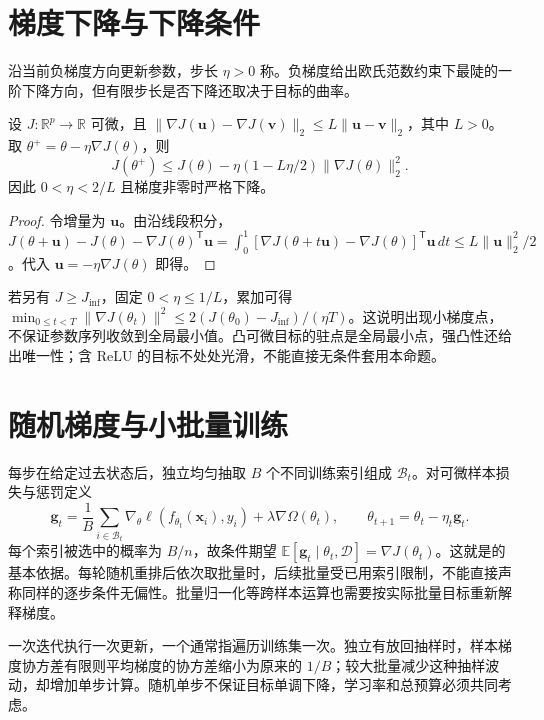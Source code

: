 \documentclass[UTF8,12pt,a4paper,fontset=fandol]{ctexbook}
\begin{document}
\section{梯度下降与下降条件}
沿当前负梯度方向更新参数，步长 $\eta>0$ 称。负梯度给出欧氏范数约束下最陡的一阶下降方向，但有限步长是否下降还取决于目标的曲率。
\begin{proposition}[光滑函数的单步下降]
设 $J:\mathbb R^p\to\mathbb R$ 可微，且 $\|\nabla J(\mathbf u)-\nabla J(\mathbf v)\|_2\leq L\|\mathbf u-\mathbf v\|_2$，其中 $L>0$。取 $\theta^+=\theta-\eta\nabla J(\theta)$，则
\begin{equation}
J(\theta^+)\leq J(\theta)-\eta(1-L\eta/2)\|\nabla J(\theta)\|_2^2.
\label{eq:dl-descent}
\end{equation}
因此 $0<\eta<2/L$ 且梯度非零时严格下降。
\end{proposition}
\begin{proof}
令增量为 $\mathbf u$。由沿线段积分，$J(\theta+\mathbf u)-J(\theta)-\nabla J(\theta)^\mathsf T\mathbf u=\int_0^1[\nabla J(\theta+t\mathbf u)-\nabla J(\theta)]^\mathsf T\mathbf u\,dt\leq L\|\mathbf u\|_2^2/2$。代入 $\mathbf u=-\eta\nabla J(\theta)$ 即得。
\end{proof}
若另有 $J\geq J_{\inf}$，固定 $0<\eta\leq1/L$，累加可得 $\min_{0\leq t<T}\|\nabla J(\theta_t)\|^2\leq2(J(\theta_0)-J_{\inf})/(\eta T)$。这说明出现小梯度点，不保证参数序列收敛到全局最小值。凸可微目标的驻点是全局最小点，强凸性还给出唯一性；含 ReLU 的目标不处处光滑，不能直接无条件套用本命题。

\section{随机梯度与小批量训练}
每步在给定过去状态后，独立均匀抽取 $B$ 个不同训练索引组成 $\mathcal B_t$。对可微样本损失与惩罚定义
\begin{equation}
\mathbf g_t=\frac1B\sum_{i\in\mathcal B_t}\nabla_\theta\ell(f_{\theta_t}(\mathbf x_i),y_i)+\lambda\nabla\Omega(\theta_t),
\qquad \theta_{t+1}=\theta_t-\eta_t\mathbf g_t.
\label{eq:dl-sgd}
\end{equation}
每个索引被选中的概率为 $B/n$，故条件期望 $\mathbb E[\mathbf g_t\mid\theta_t,\mathcal D]=\nabla J(\theta_t)$。这就是的基本依据。每轮随机重排后依次取批量时，后续批量受已用索引限制，不能直接声称同样的逐步条件无偏性。批量归一化等跨样本运算也需要按实际批量目标重新解释梯度。

一次迭代执行一次更新，一个通常指遍历训练集一次。独立有放回抽样时，样本梯度协方差有限则平均梯度的协方差缩小为原来的 $1/B$；较大批量减少这种抽样波动，却增加单步计算。随机单步不保证目标单调下降，学习率和总预算必须共同考虑。
\end{document}
